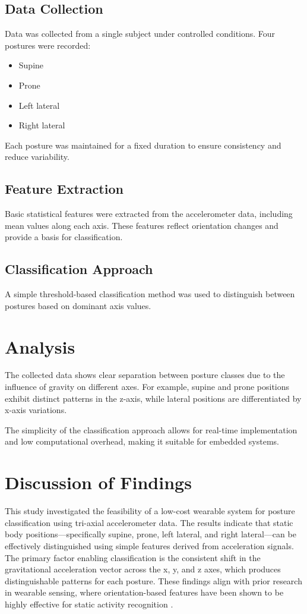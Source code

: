 \documentclass[journal]{IEEEtran}
\begin{document}
\subsection{Data Collection}
Data was collected from a single subject under controlled conditions. Four postures were recorded:
\begin{itemize}
    \item Supine
    \item Prone
    \item Left lateral
    \item Right lateral
\end{itemize}

Each posture was maintained for a fixed duration to ensure consistency and reduce variability.

\subsection{Feature Extraction}
Basic statistical features were extracted from the accelerometer data, including mean values along each axis. These features reflect orientation changes and provide a basis for classification.

\subsection{Classification Approach}
A simple threshold-based classification method was used to distinguish between postures based on dominant axis values.

\section{Analysis}

The collected data shows clear separation between posture classes due to the influence of gravity on different axes. For example, supine and prone positions exhibit distinct patterns in the z-axis, while lateral positions are differentiated by x-axis variations.

The simplicity of the classification approach allows for real-time implementation and low computational overhead, making it suitable for embedded systems.

\section{Discussion of Findings}

This study investigated the feasibility of a low-cost wearable system for posture classification using tri-axial accelerometer data. The results indicate that static body positions—specifically supine, prone, left lateral, and right lateral—can be effectively distinguished using simple features derived from acceleration signals. The primary factor enabling classification is the consistent shift in the gravitational acceleration vector across the x, y, and z axes, which produces distinguishable patterns for each posture. These findings align with prior research in wearable sensing, where orientation-based features have been shown to be highly effective for static activity recognition \cite{ref1,ref2}.
\end{document}
